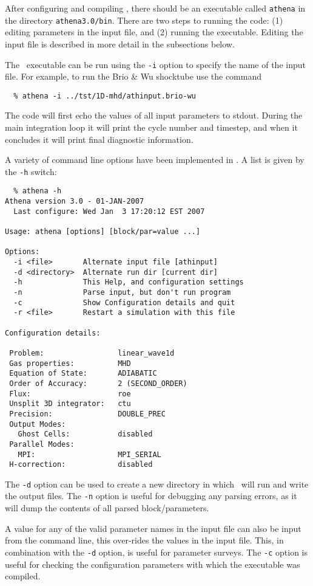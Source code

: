 After configuring and compiling \ath, there should be an executable
called {\tt athena} in the directory {\tt athena3.0/bin}.  There
are two steps to running the code: (1) editing parameters in the
input file, and (2) running the executable.  Editing the input file is 
described in more detail in the subsections below.

The \ath\ executable can be run using the {\tt -i} option to specify the name of
the input file.  For example, to run the Brio \& Wu shocktube use
the command
\begin{verbatim}
  % athena -i ../tst/1D-mhd/athinput.brio-wu
\end{verbatim}
The code will first echo the values of all input parameters to stdout.
During the main integration loop
it will print the cycle number and timestep, and
when it concludes it will print final diagnostic information.

A variety of command line options have been implemented in \ath.
A list is given by the {\tt -h} switch:
\begin{verbatim}
  % athena -h
Athena version 3.0 - 01-JAN-2007
  Last configure: Wed Jan  3 17:20:12 EST 2007

Usage: athena [options] [block/par=value ...]

Options:
  -i <file>       Alternate input file [athinput]
  -d <directory>  Alternate run dir [current dir]
  -h              This Help, and configuration settings
  -n              Parse input, but don't run program
  -c              Show Configuration details and quit
  -r <file>       Restart a simulation with this file

Configuration details:

 Problem:                 linear_wave1d
 Gas properties:          MHD
 Equation of State:       ADIABATIC
 Order of Accuracy:       2 (SECOND_ORDER)
 Flux:                    roe
 Unsplit 3D integrator:   ctu
 Precision:               DOUBLE_PREC
 Output Modes:
   Ghost Cells:           disabled
 Parallel Modes:
   MPI:                   MPI_SERIAL
 H-correction:            disabled
\end{verbatim}
The {\tt -d} option can be used to create a new directory in which
\ath\ will run and write the output files.  The {\tt -n} option is
useful for debugging any parsing errors, as it will dump the contents
of all parsed block/parameters.

A value for any of the valid parameter names in the input file can
also be input from the command line, this over-rides the values in the
input file.  This, in combination with the {\tt -d} option, is useful
for parameter surveys.  The {\tt -c} option is useful for checking the
configuration parameters with which the executable was compiled.

